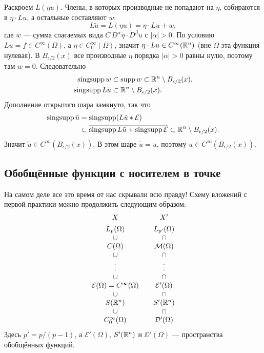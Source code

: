 \documentclass[12pt,a4paper]{article}
\begin{document}
{Раскроем \(L(\eta u)\). Члены, в которых производные не попадают на \(\eta\),
собираются в \(\eta\cdot Lu\), а остальные составляют \(w\):
\[
L\tilde u
=
L(\eta u)
=
\eta\cdot Lu+w,
\]
где \(w\) --- сумма слагаемых вида
\(C\,D^\alpha\eta\cdot D^\beta u\) с \(|\alpha|>0\).
По условию \(Lu=f\in C^\infty(\Omega)\), а \(\eta\in C_0^\infty(\Omega)\),
значит \(\eta\cdot Lu\in C^\infty(\mathbb{R}^n)\)
(вне \(\Omega\) эта функция нулевая).
В \(B_{\epsilon/2}(x)\) все производные \(\eta\) порядка \(|\alpha|>0\) равны нулю,
поэтому там \(w=0\). Следовательно
\begin{align*}
\operatorname{singsupp}w
&\subset
\operatorname{supp} w
\subset
\mathbb{R}^n\setminus B_{\epsilon/2}(x), \\
\operatorname{singsupp}L\tilde u
&\subset
\mathbb{R}^n\setminus B_{\epsilon/2}(x).
\end{align*}
Дополнение открытого шара замкнуто, так что
\begin{align*}
\operatorname{singsupp}\tilde u
&=
\operatorname{singsupp}(L\tilde u*\mathcal{E}) \\
&\subset
\overline{
    \operatorname{singsupp}L\tilde u
    +
    \operatorname{singsupp}\mathcal{E}
}
\subset
\mathbb{R}^n\setminus B_{\epsilon/2}(x).
\end{align*}
Значит \(\tilde u\in C^\infty(B_{\epsilon/2}(x))\).
В этом шаре \(\tilde u=u\), поэтому
\(u\in C^\infty(B_{\epsilon/2}(x))\).
}

\subsection{Обобщённые функции с носителем в точке}

На самом деле все это время от нас скрывали всю правду! Схему вложений с первой практики можно продолжить следующим образом:
\[
\begin{array}{ccc}
X & & X' \\[4pt]
L_p(\Omega) & & L_{p'}(\Omega) \\
\cup & & \cap \\
C(\Omega) & & \mathcal{M}(\Omega) \\
\cup & & \cap \\
\vdots & & \vdots \\
\cup & & \cap \\
\mathcal{E}(\Omega)=C^\infty(\Omega) & & \mathcal{E}'(\Omega) \\
\cup & & \cap \\
S(\mathbb{R}^n) & & S'(\mathbb{R}^n) \\
\cup & & \cap \\
C_0^\infty(\Omega) & & \mathcal{D}'(\Omega)
\end{array}
\]
Здесь \(p'=p/(p-1)\),
а \(\mathcal{E}'(\Omega)\), \(S'(\mathbb{R}^n)\) и \(\DD'(\Omega)\) ---
пространства обобщённых функций.
\end{document}
